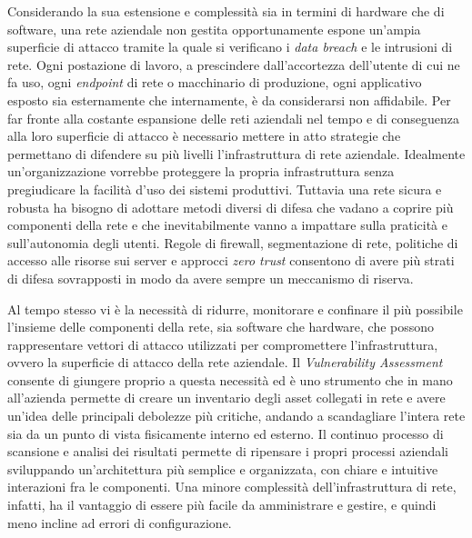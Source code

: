 \documentclass[target=bach,aauheader=]{thud}
\begin{document}
Considerando la sua estensione e complessità sia in termini di hardware che di software, una rete aziendale non gestita opportunamente espone un'ampia superficie di attacco tramite la quale si verificano i \textit{data breach} e le intrusioni di rete. Ogni postazione di lavoro, a prescindere dall'accortezza dell'utente di cui ne fa uso, ogni \textit{endpoint} di rete o macchinario di produzione, ogni applicativo esposto sia esternamente che internamente, è da considerarsi non affidabile. Per far fronte alla costante espansione delle reti aziendali nel tempo e di conseguenza alla loro superficie di attacco è necessario mettere in atto strategie che permettano di difendere su più livelli l'infrastruttura di rete aziendale. Idealmente un'organizzazione vorrebbe proteggere la propria infrastruttura senza pregiudicare la facilità d'uso dei sistemi produttivi. Tuttavia una rete sicura e robusta ha bisogno di adottare metodi diversi di difesa che vadano a coprire più componenti della rete e che inevitabilmente vanno a impattare sulla praticità e sull'autonomia degli utenti. Regole di firewall, segmentazione di rete, politiche di accesso alle risorse sui server e approcci \textit{zero trust} consentono di avere più strati di difesa sovrapposti in modo da avere sempre un meccanismo di riserva.

Al tempo stesso vi è la necessità di ridurre, monitorare e confinare il più possibile l'insieme delle componenti della rete, sia software che hardware, che possono rappresentare vettori di attacco utilizzati per compromettere l'infrastruttura, ovvero la superficie di attacco della rete aziendale. Il \textit{Vulnerability Assessment} consente di giungere proprio a questa necessità ed è uno strumento che in mano all'azienda permette di creare un inventario degli asset collegati in rete e avere un'idea delle principali debolezze più critiche, andando a scandagliare l'intera rete sia da un punto di vista fisicamente interno ed esterno. Il continuo processo di scansione e analisi dei risultati permette di ripensare i propri processi aziendali sviluppando un'architettura più semplice e organizzata, con chiare e intuitive interazioni fra le componenti. Una minore complessità dell'infrastruttura di rete, infatti, ha il vantaggio di essere più facile da amministrare e gestire, e quindi meno incline ad errori di configurazione.


\appendix

\end{document}
